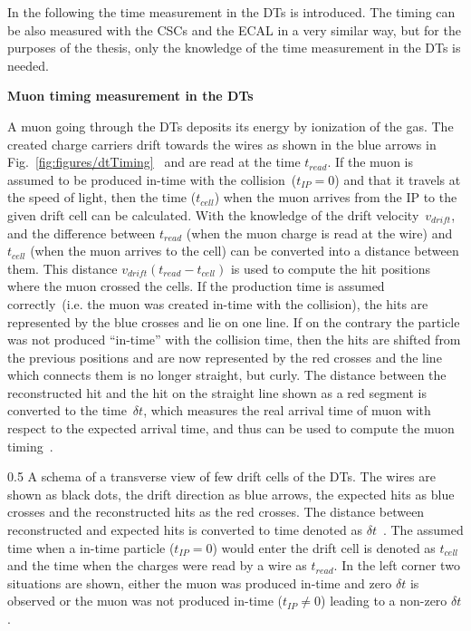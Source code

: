 In the following the time measurement in the DTs is introduced. The timing can be also measured with the CSCs and the ECAL in a very similar way, but for the purposes of the thesis, only the knowledge of the time measurement in the DTs is needed.


\textbf{Muon timing measurement in the DTs~\label{sec:muonTiming}}

A muon going through the DTs deposits its energy by ionization of the gas. The created charge carriers drift towards the wires as shown in the blue arrows in Fig.~\ref{fig:figures/dtTiming}~\cite{Traczyk:1365029} and are read at the time $t_{read}$. If the muon is assumed to be produced in-time with the collision~($t_{IP} = 0$) and that it travels at the speed of light, then the time ($t_{cell}$) when the muon arrives from the IP to the given drift cell can be calculated. With the knowledge of the drift velocity~$v_{drift}$, and the difference between $t_{read}$ (when the muon charge is read at the wire) and $t_{cell}$ (when the muon arrives to the cell) can be converted into a distance between them. This distance $ v_{drift} (t_{read} - t_{cell})$  is used to compute the hit positions where the muon crossed the cells. If the production time is assumed correctly~(i.e. the muon was created in-time with the collision), the hits are represented by the blue crosses and lie on one line. If on the contrary the particle was not produced ``in-time'' with the collision time, then the hits are shifted from the previous positions and are now represented by the red crosses and the line which connects them is no longer straight, but curly. The distance between the reconstructed hit and the hit on the straight line shown as a red segment is converted to the time~$\delta t$, which measures the real arrival time of muon with respect to the expected arrival time, and thus can be used to compute the muon timing~\cite{Traczyk:1365029}.


                 {0.5}       %
                 { A schema of a transverse view of few drift cells of the DTs. The wires are shown as black dots, the drift direction as blue arrows, the expected hits as blue crosses and the reconstructed hits as the red crosses. The distance between reconstructed and expected hits is converted to time denoted as $\delta t$~\cite{Traczyk:1365029}. The assumed time when a in-time particle ($t_{IP} = 0$) would enter the drift cell is denoted as $t_{cell}$ and the time when the charges were read by a wire as $t_{read}$. In the left corner two situations are shown, either the muon was produced in-time and zero $\delta t$ is observed or the muon was not produced in-time ($t_{IP} \neq 0$) leading to a non-zero $\delta t$. }

